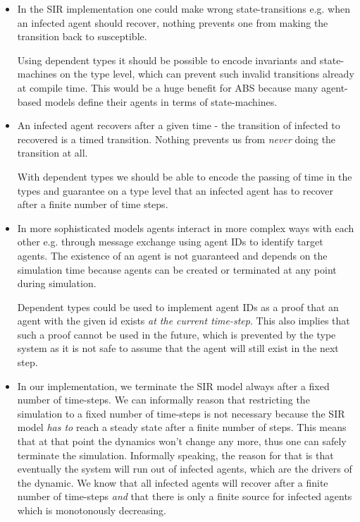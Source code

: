 \begin{itemize}

	\item In the SIR implementation one could make wrong state-transitions e.g. when an infected agent should recover, nothing prevents one from making the transition back to susceptible. 
	
	Using dependent types it should be possible to encode invariants and state-machines on the type level, which can prevent such invalid transitions already at compile time. This would be a huge benefit for ABS because many agent-based models define their agents in terms of state-machines.
	
	\item An infected agent recovers after a given time - the transition of infected to recovered is a timed transition. Nothing prevents us from \textit{never} doing the transition at all. 
	
	With dependent types we should be able to encode the passing of time in the types and guarantee on a type level that an infected agent has to recover after a finite number of time steps.
	
	\item In more sophisticated models agents interact in more complex ways with each other e.g. through message exchange using agent IDs to identify target agents. The existence of an agent is not guaranteed and depends on the simulation time because agents can be created or terminated at any point during simulation. 
	
	Dependent types could be used to implement agent IDs as a proof that an agent with the given id exists \textit{at the current time-step}. This also implies that such a proof cannot be used in the future, which is prevented by the type system as it is not safe to assume that the agent will still exist in the next step.

	\item In our implementation, we terminate the SIR model always after a fixed number of time-steps. We can informally reason that restricting the simulation to a fixed number of time-steps is not necessary because the SIR model \textit{has to} reach a steady state after a finite number of steps. This means that at that point the dynamics won't change any more, thus one can safely terminate the simulation. Informally speaking, the reason for that is that eventually the system will run out of infected agents, which are the drivers of the dynamic. We know that all infected agents will recover after a finite number of time-steps \textit{and} that there is only a finite source for infected agents which is monotonously decreasing. 
	

\end{itemize}
